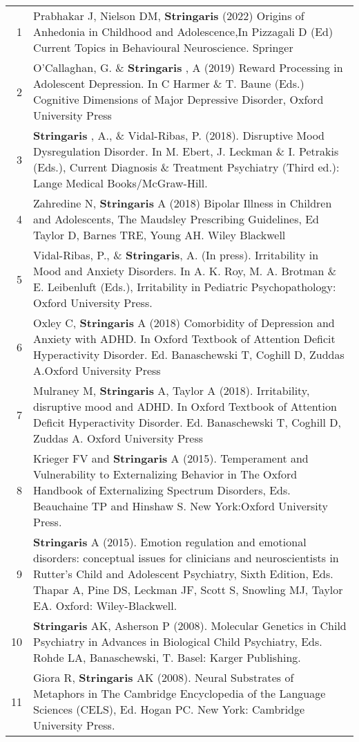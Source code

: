\documentclass[
]{article}
\begin{document}
\begin{longtable}[]{@{}rl@{}}
\toprule
\endhead
1 & Prabhakar J, Nielson DM, \textbf{Stringaris} (2022) Origins of
Anhedonia in Childhood and Adolescence,In Pizzagali D (Ed) Current
Topics in Behavioural Neuroscience. Springer\tabularnewline
2 & O'Callaghan, G. \& \textbf{Stringaris }, A (2019) Reward Processing
in Adolescent Depression. In C Harmer \& T. Baune (Eds.) Cognitive
Dimensions of Major Depressive Disorder, Oxford University
Press\tabularnewline
3 & \textbf{Stringaris }, A., \& Vidal-Ribas, P. (2018). Disruptive Mood
Dysregulation Disorder. In M. Ebert, J. Leckman \& I. Petrakis (Eds.),
Current Diagnosis \& Treatment Psychiatry (Third ed.): Lange Medical
Books/McGraw-Hill.\tabularnewline
4 & Zahredine N, \textbf{Stringaris} A (2018) Bipolar Illness in
Children and Adolescents, The Maudsley Prescribing Guidelines, Ed Taylor
D, Barnes TRE, Young AH. Wiley Blackwell\tabularnewline
5 & Vidal-Ribas, P., \& \textbf{Stringaris}, A. (In press). Irritability
in Mood and Anxiety Disorders. In A. K. Roy, M. A. Brotman \& E.
Leibenluft (Eds.), Irritability in Pediatric Psychopathology: Oxford
University Press.\tabularnewline
6 & Oxley C, \textbf{Stringaris} A (2018) Comorbidity of Depression and
Anxiety with ADHD. In Oxford Textbook of Attention Deficit Hyperactivity
Disorder. Ed. Banaschewski T, Coghill D, Zuddas A.Oxford University
Press\tabularnewline
7 & Mulraney M, \textbf{Stringaris} A, Taylor A (2018). Irritability,
disruptive mood and ADHD. In Oxford Textbook of Attention Deficit
Hyperactivity Disorder. Ed. Banaschewski T, Coghill D, Zuddas A. Oxford
University Press\tabularnewline
8 & Krieger FV and \textbf{Stringaris} A (2015). Temperament and
Vulnerability to Externalizing Behavior in The Oxford Handbook of
Externalizing Spectrum Disorders, Eds. Beauchaine TP and Hinshaw S. New
York:Oxford University Press.\tabularnewline
9 & \textbf{Stringaris} A (2015). Emotion regulation and emotional
disorders: conceptual issues for clinicians and neuroscientists in
Rutter's Child and Adolescent Psychiatry, Sixth Edition, Eds. Thapar A,
Pine DS, Leckman JF, Scott S, Snowling MJ, Taylor EA. Oxford:
Wiley-Blackwell.\tabularnewline
10 & \textbf{Stringaris} AK, Asherson P (2008). Molecular Genetics in
Child Psychiatry in Advances in Biological Child Psychiatry, Eds. Rohde
LA, Banaschewski, T. Basel: Karger Publishing.\tabularnewline
11 & Giora R, \textbf{Stringaris} AK (2008). Neural Substrates of
Metaphors in The Cambridge Encyclopedia of the Language Sciences (CELS),
Ed. Hogan PC. New York: Cambridge University Press.\tabularnewline
\bottomrule
\end{longtable}
\end{document}
